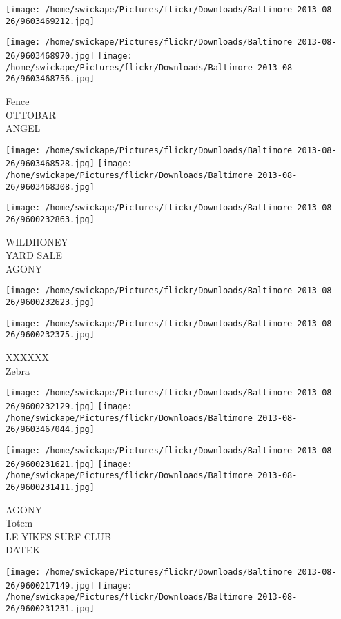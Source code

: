\documentclass[10pt,letterpaper]{article}
\begin{document}
\texttt{[image: /home/swickape/Pictures/flickr/Downloads/Baltimore 2013-08-26/9603469212.jpg]}

\vspace{0.25in}
\texttt{[image: /home/swickape/Pictures/flickr/Downloads/Baltimore 2013-08-26/9603468970.jpg]}
\texttt{[image: /home/swickape/Pictures/flickr/Downloads/Baltimore 2013-08-26/9603468756.jpg]}

Fence\\
OTTOBAR\\
ANGEL\\
\pagebreak

\texttt{[image: /home/swickape/Pictures/flickr/Downloads/Baltimore 2013-08-26/9603468528.jpg]}
\texttt{[image: /home/swickape/Pictures/flickr/Downloads/Baltimore 2013-08-26/9603468308.jpg]}

\texttt{[image: /home/swickape/Pictures/flickr/Downloads/Baltimore 2013-08-26/9600232863.jpg]}

WILDHONEY\\
YARD SALE\\
AGONY\\
\pagebreak

\texttt{[image: /home/swickape/Pictures/flickr/Downloads/Baltimore 2013-08-26/9600232623.jpg]}

\vspace{0.25in}
\texttt{[image: /home/swickape/Pictures/flickr/Downloads/Baltimore 2013-08-26/9600232375.jpg]}

XXXXXX\\
Zebra\\
\pagebreak

\texttt{[image: /home/swickape/Pictures/flickr/Downloads/Baltimore 2013-08-26/9600232129.jpg]}
\texttt{[image: /home/swickape/Pictures/flickr/Downloads/Baltimore 2013-08-26/9603467044.jpg]}

\texttt{[image: /home/swickape/Pictures/flickr/Downloads/Baltimore 2013-08-26/9600231621.jpg]}
\texttt{[image: /home/swickape/Pictures/flickr/Downloads/Baltimore 2013-08-26/9600231411.jpg]}

AGONY\\
Totem\\
LE YIKES SURF CLUB\\
DATEK\\
\pagebreak

\texttt{[image: /home/swickape/Pictures/flickr/Downloads/Baltimore 2013-08-26/9600217149.jpg]}
\texttt{[image: /home/swickape/Pictures/flickr/Downloads/Baltimore 2013-08-26/9600231231.jpg]}
\end{document}
